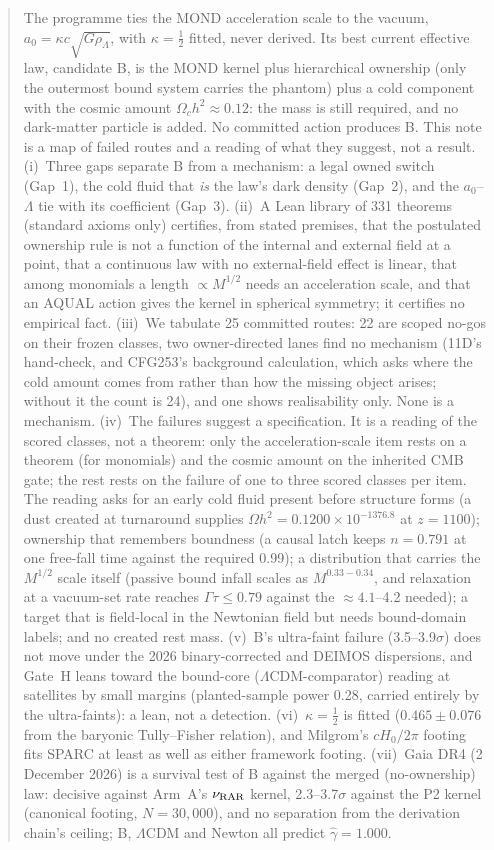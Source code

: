 \documentclass[10pt]{article}
\begin{document}
\begin{abstract}
\noindent The programme ties the MOND acceleration scale to the vacuum, $a_0=\kappa c\sqrt{G\rho_\Lambda}$, with $\kappa=\tfrac12$ fitted, never derived. Its best current effective law, candidate B, is the MOND kernel plus hierarchical ownership (only the outermost bound system carries the phantom) plus a cold component with the cosmic amount $\Omega_ch^2\approx0.12$: the mass is still required, and no dark-matter particle is added. No committed action produces B. This note is a map of failed routes and a reading of what they suggest, not a result. (i)~Three gaps separate B from a mechanism: a legal owned switch (Gap~1), the cold fluid that \emph{is} the law's dark density (Gap~2), and the $a_0$--$\Lambda$ tie with its coefficient (Gap~3). (ii)~A Lean library of 331 theorems (standard axioms only) certifies, from stated premises, that the postulated ownership rule is not a function of the internal and external field at a point, that a continuous law with no external-field effect is linear, that among monomials a length $\propto M^{1/2}$ needs an acceleration scale, and that an AQUAL action gives the kernel in spherical symmetry; it certifies no empirical fact. (iii)~We tabulate 25 committed routes: 22 are scoped no-gos on their frozen classes, two owner-directed lanes find no mechanism (11D's hand-check, and CFG253's background calculation, which asks where the cold amount comes from rather than how the missing object arises; without it the count is 24), and one shows realisability only. None is a mechanism. (iv)~The failures suggest a specification. It is a reading of the scored classes, not a theorem: only the acceleration-scale item rests on a theorem (for monomials) and the cosmic amount on the inherited CMB gate; the rest rests on the failure of one to three scored classes per item. The reading asks for an early cold fluid present before structure forms (a dust created at turnaround supplies $\Omega h^2=0.1200\times10^{-1376.8}$ at $z=1100$); ownership that remembers boundness (a causal latch keeps $n=0.791$ at one free-fall time against the required 0.99); a distribution that carries the $M^{1/2}$ scale itself (passive bound infall scales as $M^{0.33-0.34}$, and relaxation at a vacuum-set rate reaches $\Gamma\tau\le0.79$ against the $\approx4.1$--4.2 needed); a target that is field-local in the Newtonian field but needs bound-domain labels; and no created rest mass. (v)~B's ultra-faint failure (3.5--3.9$\sigma$) does not move under the 2026 binary-corrected and DEIMOS dispersions, and Gate~H leans toward the bound-core ($\Lambda$CDM-comparator) reading at satellites by small margins (planted-sample power 0.28, carried entirely by the ultra-faints): a lean, not a detection. (vi)~$\kappa=\tfrac12$ is fitted ($0.465\pm0.076$ from the baryonic Tully--Fisher relation), and Milgrom's $cH_0/2\pi$ footing fits SPARC at least as well as either framework footing. (vii)~Gaia DR4 (2 December 2026) is a survival test of B against the merged (no-ownership) law: decisive against Arm~A's $\nu_{\rm RAR}$ kernel, 2.3--3.7$\sigma$ against the P2 kernel (canonical footing, $N=30{,}000$), and no separation from the derivation chain's ceiling; B, $\Lambda$CDM and Newton all predict $\hat\gamma=1.000$.
\end{abstract}
\end{document}
